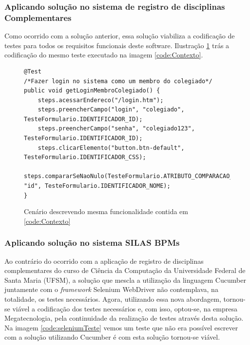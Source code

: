 \documentclass[tg]{mdtufsm}
\begin{document}
\subsubsection{Aplicando solução no sistema de registro de disciplinas Complementares}
Como ocorrido com a solução anterior, essa solução viabiliza a codificação de testes para todos os requisitos funcionais deste software. Ilustração \ref{code:seleniumPiec} trás a codificação do mesmo teste executado na imagem \ref{code:Contexto}.

\begin{figure}[!htt]
	\begin{lstlisting}
@Test
/*Fazer login no sistema como um membro do colegiado*/
public void getLoginMembroColegiado() {
    steps.acessarEndereco("/login.htm");
    steps.preencherCampo("login", "colegiado", TesteFormulario.IDENTIFICADOR_ID);
    steps.preencherCampo("senha", "colegiado123", TesteFormulario.IDENTIFICADOR_ID);
    steps.clicarElemento("button.btn-default", TesteFormulario.IDENTIFICADOR_CSS);
    steps.compararSeNaoNulo(TesteFormulario.ATRIBUTO_COMPARACAO_ASSERT_NOME_TAG, "id", TesteFormulario.IDENTIFICADOR_NOME);
}
	\end{lstlisting}
	\caption{Cenário descrevendo mesma funcionalidade contida em \ref{code:Contexto}}
	\label{code:seleniumPiec}
\end{figure}

\subsubsection{Aplicando solução no sistema SILAS BPMs}
Ao contrário do ocorrido com a aplicação de registro de disciplinas complementares do curso de Ciência da Computação da Universidade Federal de Santa Maria (UFSM), a solução que mescla a utilização da linguagem Cucumber juntamente com o \emph{framework} Selenium WebDriver não contemplava, na totalidade, os testes necessários. Agora, utilizando essa nova abordagem, tornou-se viável a codificação dos testes necessários e, com isso, optou-se, na empresa Megatecnologia, pela continuidade da realização de testes através desta solução. Na imagem \ref{code:seleniumTeste} vemos um teste que não era possível escrever com a solução utilizando Cucumber é com esta solução tornou-se viável.
\end{document}
